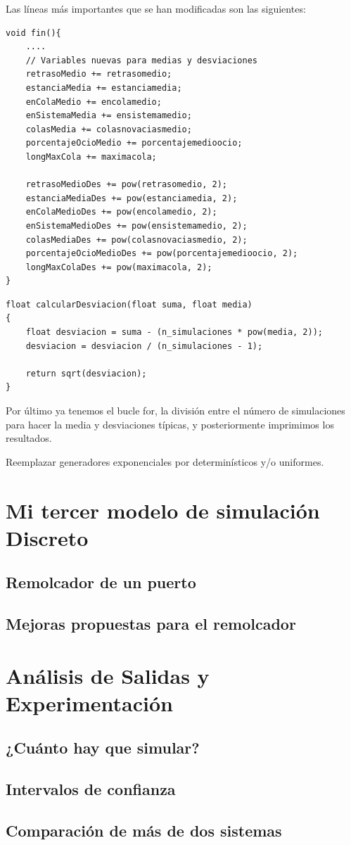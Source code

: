 \documentclass[11pt,a4paper]{report}
\begin{document}
Las líneas más importantes que se han modificadas son las siguientes:
\begin{lstlisting}
void fin(){
	....
	// Variables nuevas para medias y desviaciones
	retrasoMedio += retrasomedio;
	estanciaMedia += estanciamedia;
	enColaMedio += encolamedio;
	enSistemaMedia += ensistemamedio;
	colasMedia += colasnovaciasmedio;
	porcentajeOcioMedio += porcentajemedioocio;
	longMaxCola += maximacola;

	retrasoMedioDes += pow(retrasomedio, 2);
	estanciaMediaDes += pow(estanciamedia, 2);
	enColaMedioDes += pow(encolamedio, 2);
	enSistemaMedioDes += pow(ensistemamedio, 2);
	colasMediaDes += pow(colasnovaciasmedio, 2);
	porcentajeOcioMedioDes += pow(porcentajemedioocio, 2);
	longMaxColaDes += pow(maximacola, 2);
}
\end{lstlisting}
\begin{lstlisting}
float calcularDesviacion(float suma, float media)
{
    float desviacion = suma - (n_simulaciones * pow(media, 2));
    desviacion = desviacion / (n_simulaciones - 1);

    return sqrt(desviacion);
}
\end{lstlisting}

Por último ya tenemos el bucle for, la división entre el número de simulaciones para hacer la media y desviaciones típicas, y posteriormente imprimimos
los resultados.




Reemplazar generadores exponenciales por determinísticos y/o uniformes.















\chapter{Mi tercer modelo de simulación Discreto}

\section{Remolcador de un puerto}


\section{Mejoras propuestas para el remolcador}




\chapter{Análisis de Salidas y Experimentación}

\section{¿Cuánto hay que simular?}

\section{Intervalos de confianza}

\section{Comparación de más de dos sistemas}
\end{document}
